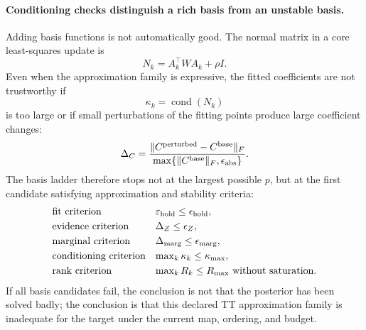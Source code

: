 \documentclass[11pt]{article}
\numberwithin{equation}{section}
\begin{document}
\paragraph{Conditioning checks distinguish a rich basis from an unstable
basis.}
Adding basis functions is not automatically good.  The normal matrix in a core
least-squares update is
\begin{equation}
    N_k=A_k^\top W A_k+\rho I.
    \label{eq:p30-basis-normal-matrix}
\end{equation}
Even when the approximation family is expressive, the fitted coefficients are
not trustworthy if
\begin{equation}
    \kappa_k=\operatorname{cond}(N_k)
    \label{eq:p30-basis-condition}
\end{equation}
is too large or if small perturbations of the fitting points produce large
coefficient changes:
\begin{equation}
    \Delta_C
    =
    \frac{\|C^{\rm perturbed}-C^{\rm base}\|_F}
         {\max\{\|C^{\rm base}\|_F,\epsilon_{\rm abs}\}}.
    \label{eq:p30-basis-coeff-stability}
\end{equation}
The basis ladder therefore stops not at the largest possible \(p\), but at the
first candidate satisfying approximation and stability criteria:
\begin{equation}
\begin{array}{ll}
\text{fit criterion} & \varepsilon_{\rm hold}\le\epsilon_{\rm hold},\\[1mm]
\text{evidence criterion} & \Delta_Z\le\epsilon_Z,\\[1mm]
\text{marginal criterion} & \Delta_{\rm marg}\le\epsilon_{\rm marg},\\[1mm]
\text{conditioning criterion} & \max_k\kappa_k\le\kappa_{\max},\\[1mm]
\text{rank criterion} & \max_kR_k\le R_{\max}\ \text{without saturation}.
\end{array}
    \label{eq:p30-basis-pass-table}
\end{equation}
If all basis candidates fail, the conclusion is not that the posterior has
been solved badly; the conclusion is that this declared TT approximation
family is inadequate for the target under the current map, ordering, and
budget.
\end{document}
